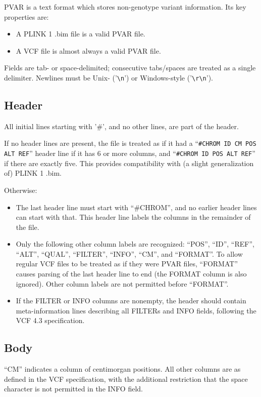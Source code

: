 \documentclass[8pt]{article}
\begin{document}
PVAR is a text format which stores non-genotype variant information.  Its key
properties are:

\begin{itemize}
\item A PLINK 1 .bim file is a valid PVAR file.
\item A VCF file is almost always a valid PVAR file.
\end{itemize}

Fields are tab- or space-delimited; consecutive tabs/spaces are treated as a
single delimiter.  Newlines must be Unix- ('\texttt{\textbackslash n}') or
Windows-style ('\texttt{\textbackslash r\textbackslash n}').

\subsection{Header}

All initial lines starting with '\#', and no other lines, are part of the
header.

If no header lines are present, the file is treated as if it had a
``\texttt{\#CHROM ID CM POS ALT REF}'' header line if it has 6 or more columns,
and ``\texttt{\#CHROM ID POS ALT REF}'' if there are exactly five.  This
provides compatibility with (a slight generalization of) PLINK 1 .bim.

Otherwise:

\begin{itemize}
\item The last header line must start with ``\#CHROM'', and no earlier header
  lines can start with that.  This header line labels the columns in the
  remainder of the file.
\item Only the following other column labels are recognized: ``POS'', ``ID'',
  ``REF'', ``ALT'', ``QUAL'', ``FILTER'', ``INFO'', ``CM'', and ``FORMAT''.  To
  allow regular VCF files to be treated as if they were PVAR files, ``FORMAT''
  causes parsing of the last header line to end (the FORMAT column is also
  ignored).  Other column labels are not permitted before ``FORMAT''.
\item If the FILTER or INFO columns are nonempty, the header should contain
  meta-information lines describing all FILTERs and INFO fields, following the
  VCF 4.3 specification.
\end{itemize}

\subsection{Body}

``CM'' indicates a column of centimorgan positions.  All other columns are as
defined in the VCF specification, with the additional restriction that the
space character is not permitted in the INFO field.
\end{document}
